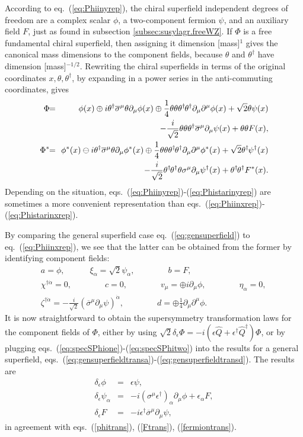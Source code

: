 \documentclass[11pt]{article}
\def\BDneg{-}
\def\BDplus{+}
\def\BDminus{-}
\def\thetasigmamuthetadagger{\theta\sigma^\mu\theta^\dagger}
\def\BDneg{}
\def\BDplus{-}
\def\BDminus{+}
\def\thetasigmamuthetadagger{\theta^\dagger\sigmabar^\mu\theta}
\def\BDneg{\ominus}
\def\BDplus{\oplus}
\def\BDminus{\ominus}
\def\thetasigmamuthetadagger{\theta\sigma^\mu\theta^\dagger}
\def\BDneg{\oplus}
\def\BDplus{\ominus}
\def\BDminus{\oplus}
\def\thetasigmamuthetadagger{\theta^\dagger\sigmabar^\mu\theta}
\newcommand{\thdthd}{\theta^\dagger\hspace{-1pt}\theta^\dagger}
\def\beq{\begin{eqnarray}}
\def\eeq{\end{eqnarray}}
\def\sigmabar{\overline\sigma}
\begin{document}
According to eq.~(\ref{eq:Phiinyrep}),
the chiral superfield independent degrees of freedom are a complex scalar $\phi$, 
a two-component fermion $\psi$,
and an auxiliary field $F$, just as found in
subsection \ref{subsec:susylagr.freeWZ}. 
If $\Phi$ is a free fundamental chiral superfield, 
then assigning it dimension [mass]$^1$
gives the canonical mass dimensions to the component fields, because
$\theta$ and $\theta^\dagger$ have dimension [mass]$^{-1/2}$. 
Rewriting the chiral superfields in terms of the 
original coordinates $x, \theta, \theta^\dagger$, by expanding in a power series in the 
anti-commuting coordinates, gives 
\beq
\Phi \!\!&=&\!\!
\phi(x) 
\BDminus i \thetasigmamuthetadagger \partial_\mu \phi(x)
\BDminus \frac{1}{4} \theta\theta\thdthd \partial_\mu \partial^\mu 
\phi(x)
+ \sqrt{2}\theta \psi(x) 
\nonumber \\ &&
- \frac{i}{\sqrt{2}} \theta\theta 
\theta^\dagger \sigmabar^\mu \partial_\mu \psi(x)
+ \theta\theta F(x),
\label{eq:Phiinxrep}
\\
\Phi^*
\!\!&=&\!\!
\phi^*(x) 
\BDplus i \thetasigmamuthetadagger  \partial_\mu \phi^*(x)
\BDminus \frac{1}{4} \theta\theta\thdthd \partial_\mu \partial^\mu 
\phi^*(x)
+ \sqrt{2}\theta^\dagger\hspace{-1pt} \psi^\dagger(x) 
\nonumber \\ &&
- \frac{i}{\sqrt{2}} \thdthd \theta \sigma^\mu \partial_\mu 
\psi^\dagger(x)
+ \thdthd F^*(x).
\label{eq:Phistarinxrep}
\eeq
Depending on the situation, eqs.~(\ref{eq:Phiinyrep})-(\ref{eq:Phistarinyrep}) are sometimes 
a more convenient representation than 
eqs.~(\ref{eq:Phiinxrep})-(\ref{eq:Phistarinxrep}).

By comparing the general superfield case 
eq.~(\ref{eq:gensuperfield}) to eq.~(\ref{eq:Phiinxrep}), we see that 
the latter can be 
obtained from the former by identifying component fields:
\beq
&& a = \phi,
\qquad\quad
\xi_\alpha = \sqrt{2} \psi_\alpha,
\qquad\qquad
b = F,
\label{eq:specSPhione}
\\
&& 
\chi^{\dagger\dot\alpha}  =0,
\qquad\qquad
c = 0,
\qquad\qquad
v_\mu = \BDneg i \partial_\mu \phi,
\qquad\qquad
\eta_\alpha = 0,
\phantom{xxx}
\\ 
&&
\zeta^{\dagger\dot\alpha} = 
-\frac{i}{\sqrt{2}} (\sigmabar^\mu \partial_\mu \psi)^{\dot\alpha}  ,
\qquad\qquad
d = \BDneg \frac{1}{4} \partial_\mu \partial^\mu \phi.
\label{eq:specSPhitwo}
\eeq
It is now straightforward to obtain the supersymmetry transformation 
laws for the component fields of 
$\Phi$, either by using 
$\sqrt{2} \delta_\epsilon \Phi = -i
(\epsilon \hat Q + \epsilon^\dagger \hat 
Q^\dagger) \Phi$, or by plugging 
eqs.~(\ref{eq:specSPhione})-(\ref{eq:specSPhitwo}) into the 
results for a general superfield, 
eqs.~(\ref{eq:gensuperfieldtransa})-(\ref{eq:gensuperfieldtransd}). 
The results are
\beq
\delta_\epsilon \phi &=& \epsilon \psi,\\
\delta_\epsilon \psi_\alpha &=& 
-i (\sigma^\mu \epsilon^\dagger)_\alpha \partial_\mu \phi + 
\epsilon_\alpha F
,
\\ 
\delta_\epsilon F &=& -i \epsilon^\dagger \sigmabar^\mu \partial_\mu \psi,
\label{eq:runningupthathill}
\eeq
in agreement with eqs.~(\ref{phitrans}), (\ref{Ftrans}), (\ref{fermiontrans}).
\end{document}
